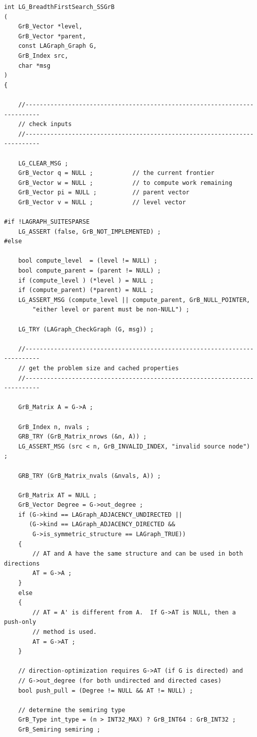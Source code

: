 \begin{verbatim}
int LG_BreadthFirstSearch_SSGrB
(
    GrB_Vector *level,
    GrB_Vector *parent,
    const LAGraph_Graph G,
    GrB_Index src,
    char *msg
)
{

    //--------------------------------------------------------------------------
    // check inputs
    //--------------------------------------------------------------------------

    LG_CLEAR_MSG ;
    GrB_Vector q = NULL ;           // the current frontier
    GrB_Vector w = NULL ;           // to compute work remaining
    GrB_Vector pi = NULL ;          // parent vector
    GrB_Vector v = NULL ;           // level vector

#if !LAGRAPH_SUITESPARSE
    LG_ASSERT (false, GrB_NOT_IMPLEMENTED) ;
#else

    bool compute_level  = (level != NULL) ;
    bool compute_parent = (parent != NULL) ;
    if (compute_level ) (*level ) = NULL ;
    if (compute_parent) (*parent) = NULL ;
    LG_ASSERT_MSG (compute_level || compute_parent, GrB_NULL_POINTER,
        "either level or parent must be non-NULL") ;

    LG_TRY (LAGraph_CheckGraph (G, msg)) ;

    //--------------------------------------------------------------------------
    // get the problem size and cached properties
    //--------------------------------------------------------------------------

    GrB_Matrix A = G->A ;

    GrB_Index n, nvals ;
    GRB_TRY (GrB_Matrix_nrows (&n, A)) ;
    LG_ASSERT_MSG (src < n, GrB_INVALID_INDEX, "invalid source node") ;

    GRB_TRY (GrB_Matrix_nvals (&nvals, A)) ;

    GrB_Matrix AT = NULL ;
    GrB_Vector Degree = G->out_degree ;
    if (G->kind == LAGraph_ADJACENCY_UNDIRECTED ||
       (G->kind == LAGraph_ADJACENCY_DIRECTED &&
        G->is_symmetric_structure == LAGraph_TRUE))
    {
        // AT and A have the same structure and can be used in both directions
        AT = G->A ;
    }
    else
    {
        // AT = A' is different from A.  If G->AT is NULL, then a push-only
        // method is used.
        AT = G->AT ;
    }

    // direction-optimization requires G->AT (if G is directed) and
    // G->out_degree (for both undirected and directed cases)
    bool push_pull = (Degree != NULL && AT != NULL) ;

    // determine the semiring type
    GrB_Type int_type = (n > INT32_MAX) ? GrB_INT64 : GrB_INT32 ;
    GrB_Semiring semiring ;


\end{verbatim}
